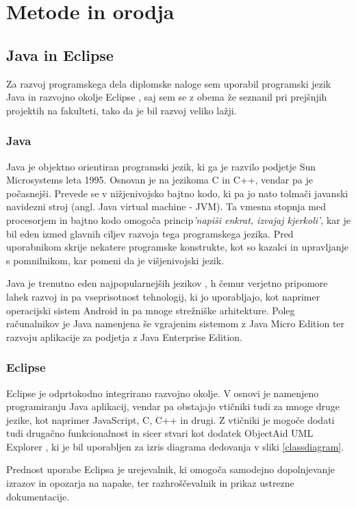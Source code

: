 \documentclass[a4paper, 12pt]{book}
\begin{document}
\chapter{Metode in orodja}
\section{Java in Eclipse}
Za razvoj programskega dela diplomske naloge sem uporabil programski jezik Java \cite{Java} in razvojno okolje Eclipse \cite{Eclipse}, saj sem se z obema že seznanil pri prejšnjih projektih na fakulteti, tako da je bil razvoj veliko lažji.
\subsection*{Java}
Java je objektno orientiran programski jezik, ki ga je razvilo podjetje Sun Microsystems leta 1995. Osnovan je na jezikoma C in C++, vendar pa je počasnejši. Prevede se v nižjenivojsko bajtno kodo, ki pa jo nato tolmači javanski navidezni stroj (angl. Java virtual machine - JVM). Ta vmesna stopnja med procesorjem in bajtno kodo omogoča princip\emph{'napiši enkrat, izvajaj kjerkoli'}, kar je bil eden izmed glavnih ciljev razvoja tega programskega jezika. Pred uporabnikom skrije nekatere programske konstrukte, kot so kazalci in upravljanje s pomnilnikom, kar pomeni da je višjenivojski jezik. 

Java je trenutno eden najpopularnejših jezikov \cite{javapopularity}, h čemur verjetno pripomore lahek razvoj in pa vseprisotnost tehnologij, ki jo uporabljajo, kot naprimer operacijski sistem Android in pa mnoge strežniške arhitekture. Poleg računalnikov je Java namenjena še vgrajenim sistemom z Java Micro Edition ter razvoju aplikacije za podjetja z Java Enterprise Edition.

\subsection*{Eclipse}

Eclipse je odprtokodno integrirano razvojno okolje. V osnovi je namenjeno programiranju Java aplikacij, vendar pa obstajajo vtičniki tudi za mnoge druge jezike, kot naprimer JavaScript, C, C++ in drugi. Z vtičniki je mogoče dodati tudi drugačno funkcionalnost in sicer stvari kot dodatek ObjectAid UML Explorer \cite{objectaid}, ki je bil uporabljen za izris diagrama dedovanja v sliki \ref{classdiagram}.

Prednost uporabe Eclipsa je urejevalnik, ki omogoča samodejno dopolnjevanje izrazov in opozarja na napake, ter razhroščevalnik in prikaz ustrezne dokumentacije. 
\end{document}

